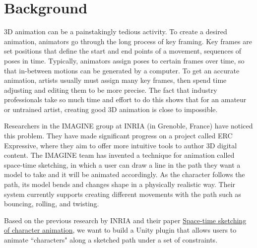 \section{Background}
\label{sec:back}
3D animation can be a painstakingly tedious activity. To create a desired animation, animators go through the long process of key framing. Key frames are set positions that define the start and end points of a movement, sequences of poses in time. Typically, animators assign poses to certain frames over time, so that in-between motions can be generated by a computer. To get an accurate animation, artists usually must assign many key frames, then spend time adjusting and editing them to be more precise. The fact that industry professionals take so much time and effort to do this shows that for an amateur or untrained artist, creating good 3D animation is close to impossible.

Researchers in the IMAGINE group at INRIA (in Grenoble, France) have noticed this problem. They have made significant progress on a project called ERC Expressive, where they aim to offer more intuitive tools to author 3D digital content. The IMAGINE team has invented a technique for animation called space-time sketching, in which a user can draw a line in the path they want a model to take and it will be animated accordingly. As the character follows the path, its model bends and changes shape in a physically realistic way. Their system currently supports creating different movements with the path such as bouncing, rolling, and twisting.

Based on the previous research by INRIA and their paper \href{https://hal.archives-ouvertes.fr/hal-01153763/file/SpaceTimeSketching.pdf}{Space-time sketching of character animation}, we want to build a Unity plugin that allows users to animate ``characters" along a sketched path under a set of constraints.

